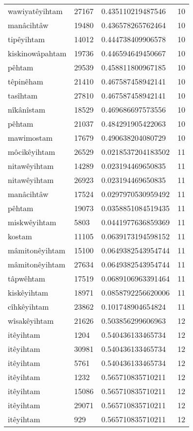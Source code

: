 \begin{longtable}{llll}
wawiyatêyihtam & 27167 & 0.435110219487546 & 10 \\
manâcihtâw & 19480 & 0.436578265762464 & 10 \\
tipêyihtam & 14012 & 0.444738409906578 & 10 \\
kiskinowâpahtam & 19736 & 0.446594649450667 & 10 \\
pêhtam & 29539 & 0.458811800967185 & 10 \\
têpinêham & 21410 & 0.467587458942141 & 10 \\
tasîhtam & 27810 & 0.467587458942141 & 10 \\
nîkânîstam & 18529 & 0.469686697573556 & 10 \\
pêhtam & 21037 & 0.484291905422063 & 10 \\
mawimostam & 17679 & 0.490638204080729 & 10 \\
môcikêyihtam & 26529 & 0.0218537204183502 & 11 \\
nitawêyihtam & 14289 & 0.023194469650835 & 11 \\
nitawêyihtam & 26923 & 0.023194469650835 & 11 \\
manâcihtâw & 17524 & 0.0297970530959492 & 11 \\
pêhtam & 19073 & 0.0358851084519435 & 11 \\
miskwêyihtam & 5803 & 0.0441977636859369 & 11 \\
kostam & 11105 & 0.0639173194598152 & 11 \\
mâmitonêyihtam & 15100 & 0.0649382543954744 & 11 \\
mâmitonêyihtam & 27634 & 0.0649382543954744 & 11 \\
tâpwêhtam & 17519 & 0.0689106963391464 & 11 \\
kiskêyihtam & 18971 & 0.0858792256620006 & 11 \\
cîhkêyihtam & 23862 & 0.101748904654824 & 11 \\
wîsakêyihtam & 21626 & 0.503856299606963 & 12 \\
itêyihtam & 1204 & 0.540436133465734 & 12 \\
itêyihtam & 30981 & 0.540436133465734 & 12 \\
itêyihtam & 5761 & 0.540436133465734 & 12 \\
itêyihtam & 1232 & 0.565710835710211 & 12 \\
itêyihtam & 15086 & 0.565710835710211 & 12 \\
itêyihtam & 29071 & 0.565710835710211 & 12 \\
itêyihtam & 929 & 0.565710835710211 & 12 \\

\end{longtable}
